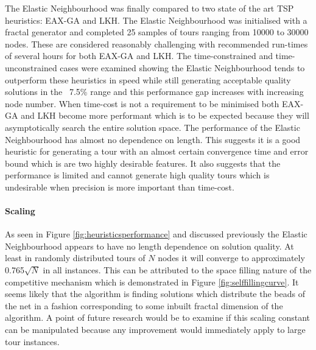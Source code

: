 The Elastic Neighbourhood was finally compared to two state of the art TSP heuristics: EAX-GA and LKH. The Elastic Neighbourhood was initialised with a fractal generator and completed 25 samples of tours ranging from 10000 to 30000 nodes. These are considered reasonably challenging with recommended run-times of several hours for both EAX-GA and LKH. The time-constrained and time-unconstrained cases were examined showing the Elastic Neighbourhood tends to outperform these heuristics in speed while still generating acceptable quality solutions in the ~7.5\% range and this performance gap increases with increasing node number. When time-cost is not a requirement to be minimised both EAX-GA and LKH become more performant which is to be expected because they will asymptotically search the entire solution space. The performance of the Elastic Neighbourhood has almost no dependence on length. This suggests it is a good heuristic for generating a tour with an almost certain convergence time and error bound which is are two highly desirable features. It also suggests that the performance is limited and cannot generate high quality tours which is undesirable when precision is more important than time-cost.
\paragraph{Scaling}
As seen in Figure \ref{fig:heuristicsperformance} and discussed previously the Elastic Neighbourhood appears to have no length dependence on solution quality. At least in randomly distributed tours of $N$ nodes it will converge to approximately 0.765$\sqrt{N}$ in all instances. This can be attributed to the space filling nature of the competitive mechanism which is demonstrated in Figure \ref{fig:selffillingcurve}. It seems likely that the algorithm is finding solutions which distribute the beads of the net in a fashion corresponding to some inbuilt fractal dimension of the algorithm. A point of future research would be to examine if this scaling constant can be manipulated because any improvement would immediately apply to large tour instances.

